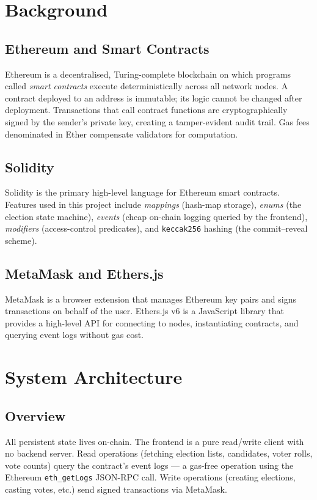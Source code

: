 \documentclass[11pt]{article}
\begin{document}
\section{Background}

\subsection{Ethereum and Smart Contracts}
Ethereum is a decentralised, Turing-complete blockchain on which programs called
\emph{smart contracts} execute deterministically across all network nodes. A contract
deployed to an address is immutable; its logic cannot be changed after deployment.
Transactions that call contract functions are cryptographically signed by the sender's
private key, creating a tamper-evident audit trail. Gas fees denominated in Ether
compensate validators for computation.

\subsection{Solidity}
Solidity is the primary high-level language for Ethereum smart contracts. Features used in
this project include \emph{mappings} (hash-map storage), \emph{enums} (the election state
machine), \emph{events} (cheap on-chain logging queried by the frontend), \emph{modifiers}
(access-control predicates), and \texttt{keccak256} hashing (the commit--reveal scheme).

\subsection{MetaMask and Ethers.js}
MetaMask is a browser extension that manages Ethereum key pairs and signs transactions on
behalf of the user. Ethers.js v6 is a JavaScript library that provides a high-level API for
connecting to nodes, instantiating contracts, and querying event logs without gas cost.

\section{System Architecture}

\subsection{Overview}
All persistent state lives on-chain. The frontend is a pure read/write client with no
backend server. Read operations (fetching election lists, candidates, voter rolls, vote
counts) query the contract's event logs --- a gas-free operation using the Ethereum
\texttt{eth\_getLogs} JSON-RPC call. Write operations (creating elections, casting votes,
etc.) send signed transactions via MetaMask.
\end{document}
